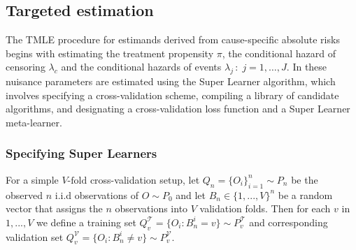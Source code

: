 \hypertarget{sec-estimation}{%
\subsection{Targeted estimation}\label{sec-estimation}}

The TMLE procedure for estimands derived from cause-specific absolute risks begins with estimating the treatment propensity \({\pi}\), the conditional hazard of censoring \(\lambda_c\) and the conditional hazards of events \(\lambda_j \,:\; j = 1, \dots, J\). In  these nuisance parameters are estimated using the Super Learner algorithm, which involves specifying a cross-validation scheme, compiling a library of candidate algorithms, and designating a cross-validation loss function and a Super Learner meta-learner.

\hypertarget{sec-cv}{%
\subsubsection{Specifying Super Learners}\label{sec-cv}}

For a simple \(V\text{-fold}\) cross-validation setup, let \(Q_n = \{O_i\}_{i=1}^n \sim P_n\) be the observed \(n\) i.i.d observations of \(O \sim P_0\) and let \(B_n \in \{1, ... , V\}^n\) be a random vector that assigns the \(n\) observations into \(V\) validation folds. Then for each \(v\) in \(1, ..., V\) we define a training set \(Q^\mathcal{T}_v = \{O_i : B_n^i = v\} \sim P^\mathcal{T}_v\) and corresponding validation set \(Q^\mathcal{V}_v = \{O_i : B_n^i \neq v\} \sim P^\mathcal{V}_v\).


